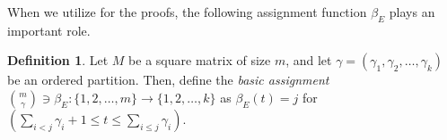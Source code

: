 \documentclass[12pt]{amsart}
\theoremstyle{definition}
\newtheorem{definition}{Definition}[section]
\newcommand{\gray}[1]{\textcolor{gray}{#1}}
\begin{document}

When we utilize  for the proofs, 
the following assignment function $\beta_E$ plays an important role. 

\begin{definition}\label{definition:beta_E}
Let $M$ be a square matrix of size $m$, and let 
$\gamma=(\gamma_1,\gamma_2,\ldots,\gamma_k)$ be an ordered partition. 
Then, define the \emph{basic assignment} 
$\binom{m}{\gamma}\ni\beta_E: \{1,2,\ldots,m\} \to \{1,2,\ldots,k\}$ 
as %
$\beta_E(t)=j$ for $(\sum_{i<j}\gamma_{i}+1\le t\le \sum_{i\leq j}\gamma_{i})$. 
\end{definition}
\end{document}
